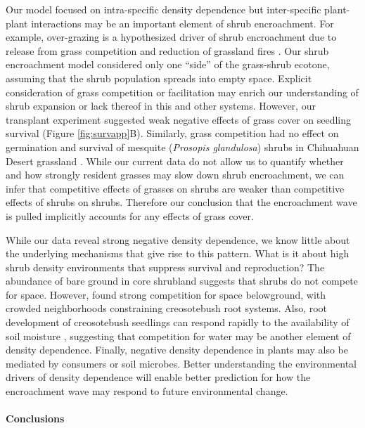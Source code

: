 \documentclass[11pt]{article}\usepackage[]{graphicx}\usepackage[usenames,dvipsnames]{xcolor}
\begin{document}
Our model focused on intra-specific density dependence but inter-specific plant-plant interactions may be an important element of shrub encroachment.
For example, over-grazing is a hypothesized driver of shrub encroachment due to release from grass competition and reduction of grassland fires \citep{van2000shrub}. 
Our shrub encroachment model considered only one ``side'' of the grass-shrub ecotone, assuming that the shrub population spreads into empty space. 
Explicit consideration of grass competition or facilitation may enrich our understanding of shrub expansion or lack thereof in this and other systems. 
However, our transplant experiment suggested weak negative effects of grass cover on seedling survival (Figure \ref{fig:survapp}B).
Similarly, grass competition had no effect on germination and survival of mesquite (\textit{Prosopis glandulosa}) shrubs in Chihuahuan Desert grassland \citep{weber2022woody}. 
While our current data do not allow us to quantify whether and how strongly resident grasses may slow down shrub encroachment, we can infer that competitive effects of grasses on shrubs are weaker than competitive effects of shrubs on shrubs.
Therefore our conclusion that the encroachment wave is pulled implicitly accounts for any effects of grass cover. 

While our data reveal strong negative density dependence, we know little about the underlying mechanisms that give rise to this pattern. 
What is it about high shrub density environments that suppress survival and reproduction?
The abundance of bare ground in core shrubland suggests that shrubs do not compete for space. 
However, \cite{brisson1994effect} found strong competition for space belowground, with crowded neighborhoods constraining creosotebush root systems. 
Also, root development of creosotebush seedlings can respond rapidly to the availability of soil moisture \citep{obrist2003increasing}, suggesting that competition for water may be another element of density dependence. 
Finally, negative density dependence in plants may also be mediated by consumers or soil microbes. 
Better understanding the environmental drivers of density dependence will enable better prediction for how the encroachment wave may respond to future environmental change.

\paragraph{Conclusions}
\end{document}
